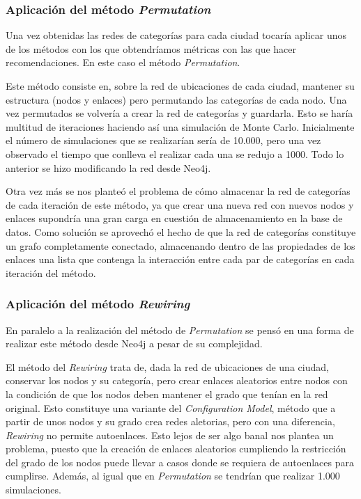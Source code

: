\subsubsection{Aplicación del método \textit{Permutation}}
Una vez obtenidas las redes de categorías para cada ciudad tocaría aplicar unos de los métodos con los que obtendríamos métricas con las que hacer recomendaciones. En este caso el método \textit{Permutation}.

Este método consiste en, sobre la red de ubicaciones de cada ciudad, mantener su estructura (nodos y enlaces) pero permutando las categorías de cada nodo. Una vez permutados se volvería a crear la red de categorías y guardarla. Esto se haría multitud de iteraciones haciendo así una simulación de Monte Carlo. Inicialmente el número de simulaciones que se realizarían sería de 10.000, pero una vez observado el tiempo que conlleva el realizar cada una se redujo a 1000. Todo lo anterior se hizo modificando la red desde Neo4j.

Otra vez más se nos planteó el problema de cómo almacenar la red de categorías de cada iteración de este método, ya que crear una nueva red con nuevos nodos y enlaces supondría una gran carga en cuestión de almacenamiento en la base de datos. Como solución se aprovechó el hecho de que la red de categorías constituye un grafo completamente conectado, almacenando dentro de las propiedades de los enlaces una lista que contenga la interacción entre cada par de categorías en cada iteración del método.


\subsubsection{Aplicación del método \textit{Rewiring}}
En paralelo a la realización del método de \textit{Permutation} se pensó en una forma de realizar este método desde Neo4j a pesar de su complejidad.

El método del \textit{Rewiring} trata de, dada la red de ubicaciones de una ciudad, conservar los nodos y su categoría, pero crear enlaces aleatorios entre nodos con la condición de que los nodos deben mantener el grado que tenían en la red original. Esto constituye una variante del \textit{Configuration Model}, método que a partir de unos nodos y su grado crea redes aletorias, pero con una diferencia, \textit{Rewiring} no permite autoenlaces. Esto lejos de ser algo banal nos plantea un problema, puesto que la creación de enlaces aleatorios cumpliendo la restricción del grado de los nodos puede llevar a casos donde se requiera de autoenlaces para cumplirse. Además, al igual que en \textit{Permutation} se tendrían que realizar 1.000 simulaciones.

